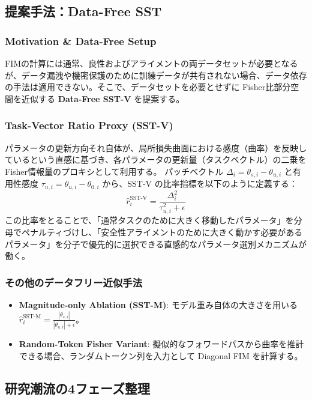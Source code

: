 \documentclass{article}
\begin{document}
\subsection{提案手法：Data-Free SST}

\subsubsection{Motivation \& Data-Free Setup}
FIMの計算には通常、良性およびアライメントの両データセットが必要となるが、データ漏洩や機密保護のために訓練データが共有されない場合、データ依存の手法は適用できない。そこで、データセットを必要とせずに Fisher比部分空間を近似する \textbf{Data-Free SST-V} を提案する。

\subsubsection{Task-Vector Ratio Proxy (SST-V)}
パラメータの更新方向それ自体が、局所損失曲面における感度（曲率）を反映しているという直感に基づき、各パラメータの更新量（タスクベクトル）の二乗を Fisher情報量のプロキシとして利用する。
パッチベクトル $\Delta_i = \theta_{s,i} - \theta_{u,i}$ と有用性感度 $\tau_{u,i} = \theta_{u,i} - \theta_{0,i}$ から、SST-V の比率指標を以下のように定義する：
\[ \hat{r}_i^{\text{SST-V}} = \frac{\Delta_i^2}{\tau_{u,i}^2 + \epsilon} \]
この比率をとることで、「通常タスクのために大きく移動したパラメータ」を分母でペナルティづけし、「安全性アライメントのために大きく動かす必要があるパラメータ」を分子で優先的に選択できる直感的なパラメータ選別メカニズムが働く。

\subsubsection{その他のデータフリー近似手法}
\begin{itemize}
    \item \textbf{Magnitude-only Ablation (SST-M)}: モデル重み自体の大きさを用いる $\hat{r}_i^{\text{SST-M}} = \frac{|\theta_{s,i}|}{|\theta_{u,i}| + \epsilon}$。
    \item \textbf{Random-Token Fisher Variant}: 擬似的なフォワードパスから曲率を推計できる場合、ランダムトークン列を入力として Diagonal FIM を計算する。
\end{itemize}

\subsection{研究潮流の4フェーズ整理}
\end{document}
